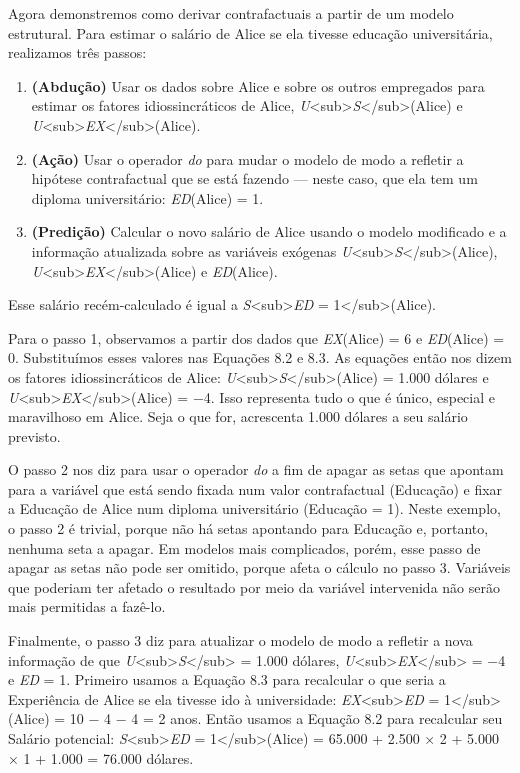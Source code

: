 \documentclass[11pt,a5paper,twoside]{book}
\begin{document}
Agora demonstremos como derivar contrafactuais a partir de um modelo estrutural. Para estimar o salário de Alice se ela tivesse educação universitária, realizamos três passos:

\begin{enumerate}
\item \textbf{(Abdução)} Usar os dados sobre Alice e sobre os outros empregados para estimar os fatores idiossincráticos de Alice, \textit{U}<sub>\textit{S}</sub>(Alice) e \textit{U}<sub>\textit{EX}</sub>(Alice).
\item \textbf{(Ação)} Usar o operador \textit{do} para mudar o modelo de modo a refletir a hipótese contrafactual que se está fazendo — neste caso, que ela tem um diploma universitário: \textit{ED}(Alice) = 1.
\item \textbf{(Predição)} Calcular o novo salário de Alice usando o modelo modificado e a informação atualizada sobre as variáveis exógenas \textit{U}<sub>\textit{S}</sub>(Alice), \textit{U}<sub>\textit{EX}</sub>(Alice) e \textit{ED}(Alice).
\end{enumerate}
Esse salário recém-calculado é igual a \textit{S}<sub>\textit{ED} = 1</sub>(Alice).

Para o passo 1, observamos a partir dos dados que \textit{EX}(Alice) = 6 e \textit{ED}(Alice) = 0. Substituímos esses valores nas Equações 8.2 e 8.3. As equações então nos dizem os fatores idiossincráticos de Alice: \textit{U}<sub>\textit{S}</sub>(Alice) = 1.000 dólares e \textit{U}<sub>\textit{EX}</sub>(Alice) = −4. Isso representa tudo o que é único, especial e maravilhoso em Alice. Seja o que for, acrescenta 1.000 dólares a seu salário previsto.

O passo 2 nos diz para usar o operador \textit{do} a fim de apagar as setas que apontam para a variável que está sendo fixada num valor contrafactual (Educação) e fixar a Educação de Alice num diploma universitário (Educação = 1). Neste exemplo, o passo 2 é trivial, porque não há setas apontando para Educação e, portanto, nenhuma seta a apagar. Em modelos mais complicados, porém, esse passo de apagar as setas não pode ser omitido, porque afeta o cálculo no passo 3. Variáveis que poderiam ter afetado o resultado por meio da variável intervenida não serão mais permitidas a fazê-lo.

Finalmente, o passo 3 diz para atualizar o modelo de modo a refletir a nova informação de que \textit{U}<sub>\textit{S}</sub> = 1.000 dólares, \textit{U}<sub>\textit{EX}</sub> = −4 e \textit{ED} = 1. Primeiro usamos a Equação 8.3 para recalcular o que seria a Experiência de Alice se ela tivesse ido à universidade: \textit{EX}<sub>\textit{ED} = 1</sub>(Alice) = 10 − 4 − 4 = 2 anos. Então usamos a Equação 8.2 para recalcular seu Salário potencial: \textit{S}<sub>\textit{ED} = 1</sub>(Alice) = 65.000 + 2.500 × 2 + 5.000 × 1 + 1.000 = 76.000 dólares.
\end{document}
